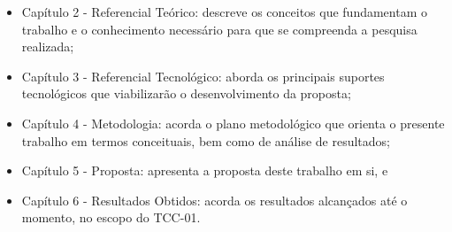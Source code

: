 \begin{itemize}


        \item Capítulo 2 - Referencial Teórico: descreve os conceitos que fundamentam o trabalho e o conhecimento necessário para que se compreenda a pesquisa realizada;
        
        \item Capítulo 3 - Referencial Tecnológico: aborda os principais suportes tecnológicos que viabilizarão o desenvolvimento da proposta;
        
        \item Capítulo 4 - Metodologia: acorda o plano metodológico que orienta o presente trabalho em termos conceituais, bem como de análise de resultados;

        \item Capítulo 5 - Proposta: apresenta a proposta deste trabalho em si, e

        \item Capítulo 6 - Resultados Obtidos: acorda os resultados alcançados até o momento, no escopo do TCC-01.
          
\end{itemize}
